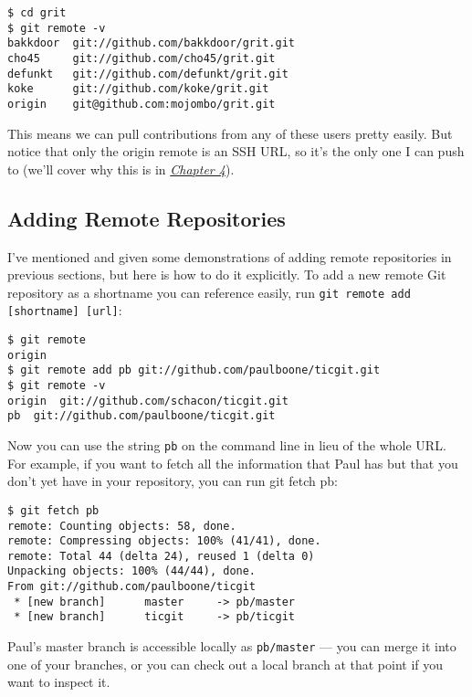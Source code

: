 \documentclass[a4paper]{book}
\newcommand{\prechap}{Chapter }
\newcommand{\postchap}{}
\newcommand{\chapref}[1]{\hyperref[chap:#1]{\prechap #1\postchap}}
\begin{document}
\begin{shaded}\begin{verbatim}
$ cd grit
$ git remote -v
bakkdoor  git://github.com/bakkdoor/grit.git
cho45     git://github.com/cho45/grit.git
defunkt   git://github.com/defunkt/grit.git
koke      git://github.com/koke/grit.git
origin    git@github.com:mojombo/grit.git
\end{verbatim}\end{shaded}

This means we can pull contributions from any of these users pretty easily. But notice that only the origin remote is an SSH URL, so it's the only one I can push to (we'll cover why this is in \emph{\chapref{4}}).

\subsection{Adding Remote Repositories}

I've mentioned and given some demonstrations of adding remote repositories in previous sections, but here is how to do it explicitly. To add a new remote Git repository as a shortname you can reference easily, run \texttt{git remote add {[}shortname{]} {[}url{]}}:

\begin{shaded}\begin{verbatim}
$ git remote
origin
$ git remote add pb git://github.com/paulboone/ticgit.git
$ git remote -v
origin	git://github.com/schacon/ticgit.git
pb	git://github.com/paulboone/ticgit.git
\end{verbatim}\end{shaded}

Now you can use the string \texttt{pb} on the command line in lieu of the whole URL. For example, if you want to fetch all the information that Paul has but that you don't yet have in your repository, you can run git fetch pb:

\begin{shaded}\begin{verbatim}
$ git fetch pb
remote: Counting objects: 58, done.
remote: Compressing objects: 100% (41/41), done.
remote: Total 44 (delta 24), reused 1 (delta 0)
Unpacking objects: 100% (44/44), done.
From git://github.com/paulboone/ticgit
 * [new branch]      master     -> pb/master
 * [new branch]      ticgit     -> pb/ticgit
\end{verbatim}\end{shaded}

Paul's master branch is accessible locally as \texttt{pb/master} --- you can merge it into one of your branches, or you can check out a local branch at that point if you want to inspect it.
\end{document}
